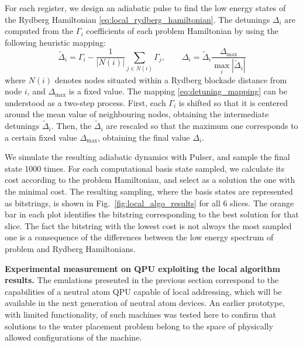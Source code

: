 \documentclass[fleqn,10pt]{wlscirep}
\begin{document}
For each register, we design an adiabatic pulse to find the low energy states of the Rydberg Hamiltonian \eqref{eq:local_rydberg_hamiltonian}. The detunings $\Delta_i$ are computed from the $\Gamma_i$ coefficients of each problem Hamiltonian by using the following heuristic mapping:
\begin{equation}\label{eq:detuning_mapping}
    \tilde{\Delta}_i = \Gamma_i - \frac{1}{|N(i)|}\sum_{j \in N(i)} \Gamma_j, \quad \quad \Delta_i = \tilde{\Delta}_i \frac{\Delta_\text{max}}{\max_i |\tilde{\Delta}_i|}
\end{equation}
where $N(i)$ denotes nodes situated within a Rydberg blockade distance from node $i$, and $\Delta_{\max}$ is a fixed value. The mapping \eqref{eq:detuning_mapping} can be understood as a two-step process. First, each $\Gamma_i$ is shifted so that it is centered around the mean value of neighbouring nodes, obtaining the intermediate detunings $\tilde{\Delta}_i$. Then, the $\tilde{\Delta}_i$ are rescaled so that the maximum one corresponds to a certain fixed value $\Delta_{\max}$, obtaining the final value $\Delta_i$.

We simulate the resulting adiabatic dynamics with Pulser, and sample the final state 1000 times. For each computational basis state sampled, we calculate its cost according to the problem Hamiltonian, and select as a solution the one with the minimal cost. The resulting sampling, where the basis states are represented as bitstrings, is shown in Fig.~\ref{fig:local_algo_results} for all 6 slices. The orange bar in each plot identifies the bitstring corresponding to the best solution for that slice. The fact the bitstring with the lowest cost is not always the most sampled one is a consequence of the differences between the low energy spectrum of problem and Rydberg Hamiltonians. 

\textbf{Experimental measurement on QPU exploiting the local algorithm results.} The emulations presented in the previous section correspond to the capabilities of a neutral atom QPU capable of local addressing, which will be available in the next generation of neutral atom devices. An earlier prototype, with limited functionality, of such machines was tested here to confirm that solutions to the water placement problem belong to the space of physically allowed configurations of the machine.
\end{document}
